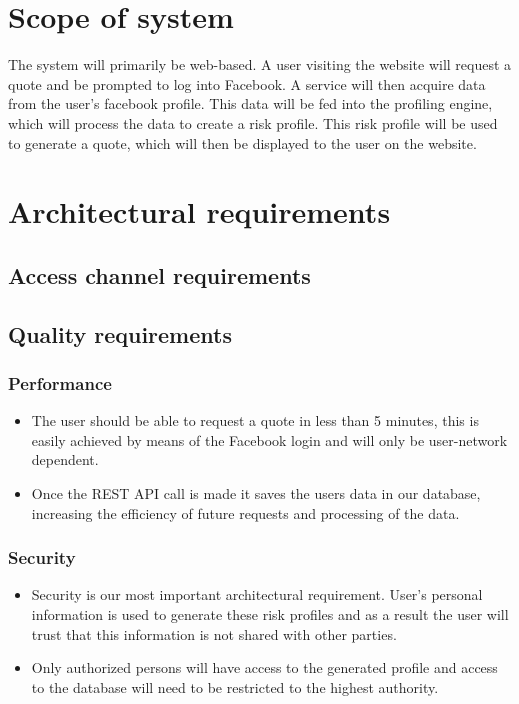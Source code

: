 \documentclass{article}
\begin{document}
\section{Scope of system}
The system will primarily be web-based. A user visiting the website will request a quote and be prompted to log into Facebook. A service will then acquire data from the user’s facebook profile. This data will be fed into the profiling engine, which will process the data to create a risk profile. This risk profile will be used to generate a quote, which will then be displayed to the user on the website.

\section{Architectural requirements}
	\subsection{Access channel requirements}
	
	\subsection{Quality requirements}
		\subsubsection{Performance}
		\begin{itemize}
			\item The user should be able to request a quote in less than 5 minutes, this is easily achieved by means of the Facebook login and will only be user-network dependent.
			\item Once the REST API call is made it saves the users data in our database, increasing the efficiency of future requests and processing of the data.
		\end{itemize}
		 
		\subsubsection{Security}
		\begin{itemize}
			\item Security is our most important architectural requirement. User's personal information is used to generate these risk profiles and as a result the user will trust that this information is not shared with other parties.
			\item Only authorized persons will have access to the generated profile and access to the database will need to be restricted to the highest authority.
		\end{itemize}
\end{document}
